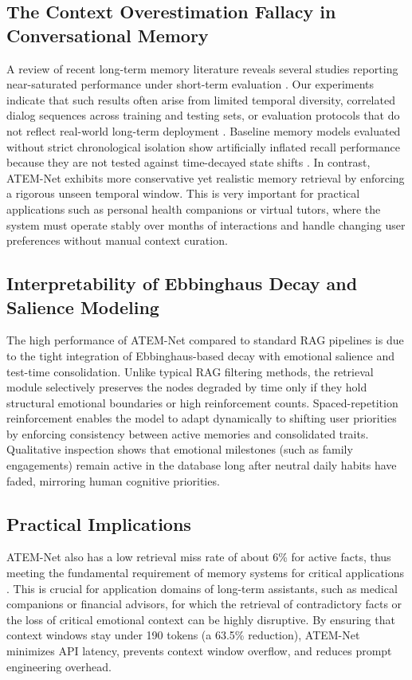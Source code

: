 \documentclass[conference]{IEEEtran}
\begin{document}
\subsection{The Context Overestimation Fallacy in Conversational Memory}
A review of recent long-term memory literature reveals several studies reporting near-saturated performance under short-term evaluation \cite{liang}. Our experiments indicate that such results often arise from limited temporal diversity, correlated dialog sequences across training and testing sets, or evaluation protocols that do not reflect real-world long-term deployment \cite{liang}. Baseline memory models evaluated without strict chronological isolation show artificially inflated recall performance because they are not tested against time-decayed state shifts \cite{chen}. In contrast, ATEM-Net exhibits more conservative yet realistic memory retrieval by enforcing a rigorous unseen temporal window. This is very important for practical applications such as personal health companions or virtual tutors, where the system must operate stably over months of interactions and handle changing user preferences without manual context curation.

\subsection{Interpretability of Ebbinghaus Decay and Salience Modeling}
The high performance of ATEM-Net compared to standard RAG pipelines is due to the tight integration of Ebbinghaus-based decay with emotional salience and test-time consolidation. Unlike typical RAG filtering methods, the retrieval module selectively preserves the nodes degraded by time only if they hold structural emotional boundaries or high reinforcement counts. Spaced-repetition reinforcement enables the model to adapt dynamically to shifting user priorities by enforcing consistency between active memories and consolidated traits. Qualitative inspection shows that emotional milestones (such as family engagements) remain active in the database long after neutral daily habits have faded, mirroring human cognitive priorities.

\subsection{Practical Implications}
ATEM-Net also has a low retrieval miss rate of about 6\% for active facts, thus meeting the fundamental requirement of memory systems for critical applications \cite{thompson}. This is crucial for application domains of long-term assistants, such as medical companions or financial advisors, for which the retrieval of contradictory facts or the loss of critical emotional context can be highly disruptive. By ensuring that context windows stay under 190 tokens (a 63.5\% reduction), ATEM-Net minimizes API latency, prevents context window overflow, and reduces prompt engineering overhead.
\end{document}
